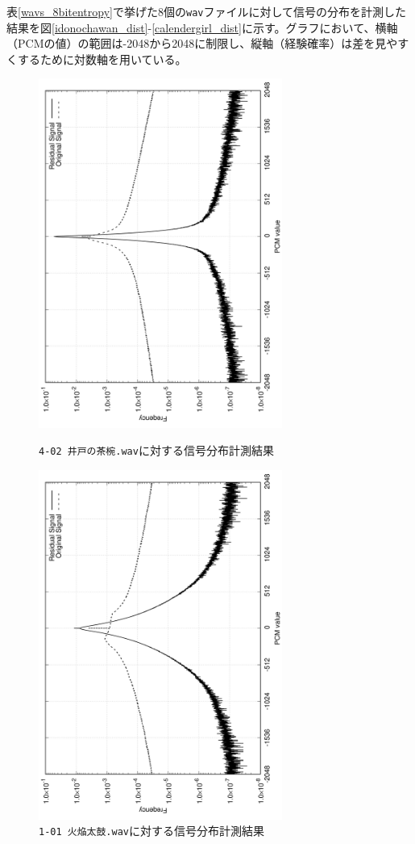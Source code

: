 \documentclass[uplatex,dvipdfmx,b5j,10pt]{jsbook}
\theoremstyle{definition}
\begin{document}
表\ref{wavs_8bitentropy}で挙げた8個の\texttt{wav}ファイルに対して信号の分布を計測した結果を図\ref{idonochawan_dist}-\ref{calendergirl_dist}に示す。グラフにおいて、横軸（PCMの値）の範囲は-2048から2048に制限し、縦軸（経験確率）は差を見やすくするために対数軸を用いている。
\begin{figure}[htbp]
  \begin{center}
    \includegraphics[width=80mm,angle=-90]{./figs/idonochawan_dist.png}
    \caption{\texttt{4-02 井戸の茶椀.wav}に対する信号分布計測結果} \label{idonochawan_dist}
  \end{center}
  \begin{center}
    \includegraphics[width=80mm,angle=-90]{./figs/kaendaiko_dist.png}
    \caption{\texttt{1-01 火焔太鼓.wav}に対する信号分布計測結果} \label{kaendaiko_dist}
  \end{center}
\end{figure}
\end{document}

